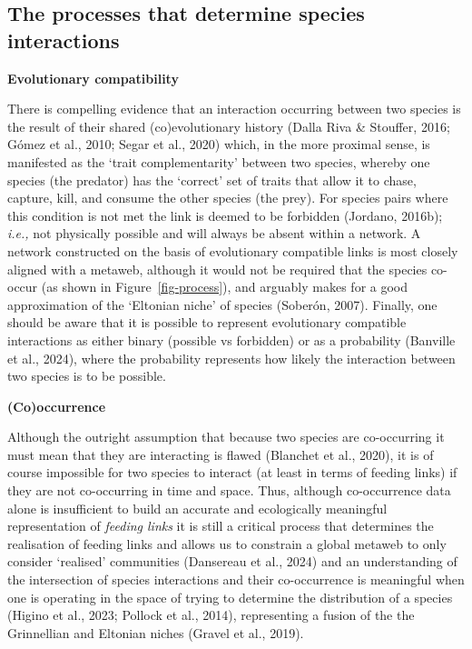 \documentclass[
]{article}
\begin{document}
\subsection{The processes that determine species
interactions}\label{the-processes-that-determine-species-interactions}

\textbf{Evolutionary compatibility}

There is compelling evidence that an interaction occurring between two
species is the result of their shared (co)evolutionary history (Dalla
Riva \& Stouffer, 2016; Gómez et al., 2010; Segar et al., 2020) which,
in the more proximal sense, is manifested as the `trait complementarity'
between two species, whereby one species (the predator) has the
`correct' set of traits that allow it to chase, capture, kill, and
consume the other species (the prey). For species pairs where this
condition is not met the link is deemed to be forbidden (Jordano,
2016b); \emph{i.e.,} not physically possible and will always be absent
within a network. A network constructed on the basis of evolutionary
compatible links is most closely aligned with a metaweb, although it
would not be required that the species co-occur (as shown in
Figure~\ref{fig-process}), and arguably makes for a good approximation
of the `Eltonian niche' of species (Soberón, 2007). Finally, one should
be aware that it is possible to represent evolutionary compatible
interactions as either binary (possible vs forbidden) or as a
probability (Banville et al., 2024), where the probability represents
how likely the interaction between two species is to be possible.

\textbf{(Co)occurrence}

Although the outright assumption that because two species are
co-occurring it must mean that they are interacting is flawed (Blanchet
et al., 2020), it is of course impossible for two species to interact
(at least in terms of feeding links) if they are not co-occurring in
time and space. Thus, although co-occurrence data alone is insufficient
to build an accurate and ecologically meaningful representation of
\emph{feeding links} it is still a critical process that determines the
realisation of feeding links and allows us to constrain a global metaweb
to only consider `realised' communities (Dansereau et al., 2024) and an
understanding of the intersection of species interactions and their
co-occurrence is meaningful when one is operating in the space of trying
to determine the distribution of a species (Higino et al., 2023; Pollock
et al., 2014), representing a fusion of the the Grinnellian and Eltonian
niches (Gravel et al., 2019).
\end{document}
